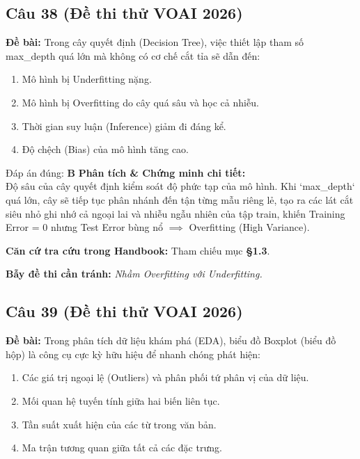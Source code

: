 \documentclass[10pt,a4paper]{article}
\begin{document}
\subsection*{Câu 38 (Đề thi thử VOAI 2026)}
\textbf{Đề bài:} Trong cây quyết định (Decision Tree), việc thiết lập tham số max\_depth quá lớn mà không có cơ chế cắt tỉa sẽ dẫn đến:

\begin{enumerate}[label=\textbf{\Alph*.}]
    \item Mô hình bị Underfitting nặng.
    \item Mô hình bị Overfitting do cây quá sâu và học cả nhiễu.
    \item Thời gian suy luận (Inference) giảm đi đáng kể.
    \item Độ chệch (Bias) của mô hình tăng cao.
\end{enumerate}

\begin{solbox}{Đáp án đúng: \textbf{B}}
\textbf{Phân tích \& Chứng minh chi tiết:} \\
Độ sâu của cây quyết định kiểm soát độ phức tạp của mô hình. Khi `max\_depth` quá lớn, cây sẽ tiếp tục phân nhánh đến tận từng mẫu riêng lẻ, tạo ra các lát cắt siêu nhỏ ghi nhớ cả ngoại lai và nhiễu ngẫu nhiên của tập train, khiến Training Error = 0 nhưng Test Error bùng nổ $\implies$ Overfitting (High Variance).

\vspace{0.4em}
\textbf{Căn cứ tra cứu trong Handbook:} Tham chiếu mục \textbf{§1.3}.

\vspace{0.4em}
\textbf{Bẫy đề thi cần tránh:} \textit{Nhầm Overfitting với Underfitting.}
\end{solbox}
\vspace{0.5em}


\subsection*{Câu 39 (Đề thi thử VOAI 2026)}
\textbf{Đề bài:} Trong phân tích dữ liệu khám phá (EDA), biểu đồ Boxplot (biểu đồ hộp) là công cụ cực kỳ hữu hiệu để nhanh chóng phát hiện:

\begin{enumerate}[label=\textbf{\Alph*.}]
    \item Các giá trị ngoại lệ (Outliers) và phân phối tứ phân vị của dữ liệu.
    \item Mối quan hệ tuyến tính giữa hai biến liên tục.
    \item Tần suất xuất hiện của các từ trong văn bản.
    \item Ma trận tương quan giữa tất cả các đặc trưng.
\end{enumerate}
\end{document}
